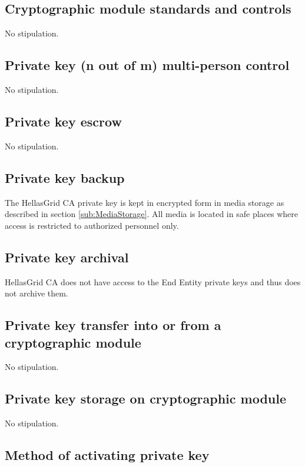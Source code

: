 \subsection{Cryptographic module standards and controls}

No stipulation. 

\subsection{Private key (n out of m) multi-person control}

No stipulation. 

\subsection{Private key escrow}

No stipulation.

\subsection{Private key backup}

The HellasGrid CA private key is kept in encrypted form in media storage as described in section \ref{sub:MediaStorage}. All media is located in safe places where access is restricted to authorized personnel only.

\subsection{Private key archival}

HellasGrid CA does not have access to the End Entity private keys and thus does not archive them.

\subsection{Private key transfer into or from a cryptographic module}

No stipulation.

\subsection{Private key storage on cryptographic module}

No stipulation.

\subsection{Method of activating private key}

